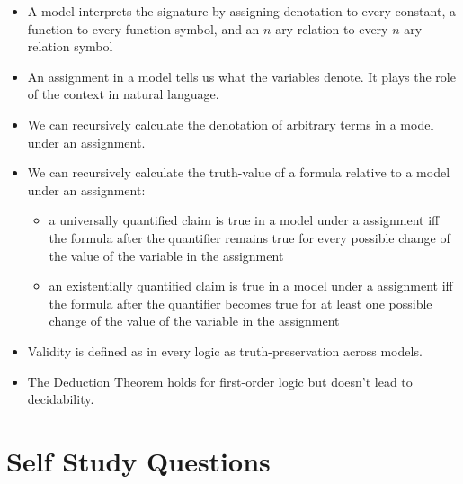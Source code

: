\begin{itemize}
	
		\item A model interprets the signature by assigning denotation to every constant, a function to every function symbol, and an $n$-ary relation to every $n$-ary relation symbol
		
		\item An assignment in a model tells us what the variables denote. It plays the role of the context in natural language. 
	
		\item We can recursively calculate the denotation of arbitrary terms in a model under an assignment.
		
		\item We can recursively calculate the truth-value of a formula relative to a model under an assignment:
		
		\begin{itemize}
		
			\item a universally quantified claim is true in a model under a assignment iff the formula after the quantifier remains true for every possible change of the value of the variable in the assignment
			
			\item an existentially quantified claim is true in a model under a assignment iff the formula after the quantifier becomes true for at least one possible change of the value of the variable in the assignment
		
		\end{itemize}
		
		\item Validity is defined as in every logic as truth-preservation across models.
		
		\item The Deduction Theorem holds for first-order logic but doesn't lead to decidability.
	
	\end{itemize}


\section{Self Study Questions}

